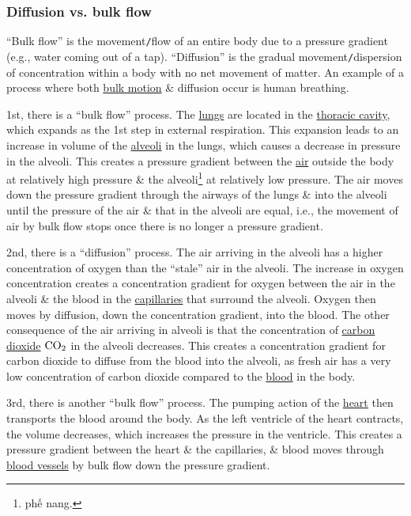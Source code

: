 \documentclass{article}
\begin{document}
\subsubsection{Diffusion vs. bulk flow}
``Bulk flow'' is the movement{\tt/}flow of an entire body due to a pressure gradient (e.g., water coming out of a tap). ``Diffusion'' is the gradual movement{\tt/}dispersion of concentration within a body with no net movement of matter. An example of a process where both \href{https://en.wikipedia.org/wiki/Mass_flow_(life_sciences)}{bulk motion} \& diffusion occur is human breathing.

1st, there is a ``bulk flow'' process. The \href{https://en.wikipedia.org/wiki/Lungs}{lungs} are located in the \href{https://en.wikipedia.org/wiki/Thoracic_cavity}{thoracic cavity}, which expands as the 1st step in external respiration. This expansion leads to an increase in volume of the \href{https://en.wikipedia.org/wiki/Pulmonary_alveolus}{alveoli} in the lungs, which causes a decrease in pressure in the alveoli. This creates a pressure gradient between the \href{https://en.wikipedia.org/wiki/Air}{air} outside the body at relatively high pressure \& the alveoli\footnote{phế nang.} at relatively low pressure. The air moves down the pressure gradient through the airways of the lungs \& into the alveoli until the pressure of the air \& that in the alveoli are equal, i.e., the movement of air by bulk flow stops once there is no longer a pressure gradient.

2nd, there is a ``diffusion'' process. The air arriving in the alveoli has a higher concentration of oxygen than the ``stale'' air in the alveoli. The increase in oxygen concentration creates a concentration gradient for oxygen between the air in the alveoli \& the blood in the \href{https://en.wikipedia.org/wiki/Capillaries}{capillaries} that surround the alveoli. Oxygen then moves by diffusion, down the concentration gradient, into the blood. The other consequence of the air arriving in alveoli is that the concentration of \href{https://en.wikipedia.org/wiki/Carbon_dioxide}{carbon dioxide} $\rm CO_2$ in the alveoli decreases. This creates a concentration gradient for carbon dioxide to diffuse from the blood into the alveoli, as fresh air has a very low concentration of carbon dioxide compared to the \href{https://en.wikipedia.org/wiki/Blood}{blood} in the body.

3rd, there is another ``bulk flow'' process. The pumping action of the \href{https://en.wikipedia.org/wiki/Heart}{heart} then transports the blood around the body. As the left ventricle of the heart contracts, the volume decreases, which increases the pressure in the ventricle. This creates a pressure gradient between the heart \& the capillaries, \& blood moves through \href{https://en.wikipedia.org/wiki/Blood_vessel}{blood vessels} by bulk flow down the pressure gradient.
\end{document}
